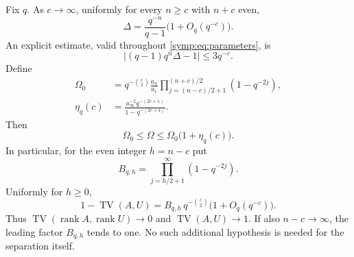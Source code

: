 \begin{theorem}
\label{symp:thm:separation}
Fix $q$.  As $c\to\infty$, uniformly for every $n\ge c$ with $n+c$ even,
\begin{equation}
 \Delta=\frac{q^{-n}}{q-1}\bigl(1+O_q(q^{-c})\bigr).
 \label{symp:eq:rank-asymptotic}
\end{equation}
An explicit estimate, valid throughout \eqref{symp:eq:parameters}, is
\begin{equation}
 \left|(q-1)q^n\Delta-1\right|\le3q^{-c}.
 \label{symp:eq:rank-explicit}
\end{equation}
Define
\begin{align}
 \Omega_0&=q^{-\binom c2}\frac{a_n}{a_c}
  \prod_{j=(n-c)/2+1}^{(n+c)/2}(1-q^{-2j}),
  \label{symp:eq:leading-overlap}\\
 \eta_q(c)&=\frac{a_\infty^{-2}q^{-(2c+1)}}{1-q^{-(2c+4)}}.
  \label{symp:eq:overlap-error}
\end{align}
Then
\begin{equation}
 \Omega_0\le\Omega\le\Omega_0\bigl(1+\eta_q(c)\bigr).
 \label{symp:eq:overlap-certified}
\end{equation}
In particular, for the even integer $h=n-c$ put
\[
 B_{q,h}=\prod_{j=h/2+1}^{\infty}(1-q^{-2j}).
\]
Uniformly for $h\ge0$,
\begin{equation}
 1-\operatorname{TV}(A,U)
 =B_{q,h}\,q^{-\binom c2}\bigl(1+O_q(q^{-c})\bigr).
 \label{symp:eq:full-asymptotic}
\end{equation}
Thus $\operatorname{TV}(\operatorname{rank}A,\operatorname{rank}U)\to0$
and $\operatorname{TV}(A,U)\to1$.  If also $n-c\to\infty$, the leading
factor $B_{q,h}$ tends to one.  No such additional hypothesis is needed for
the separation itself.
\end{theorem}


